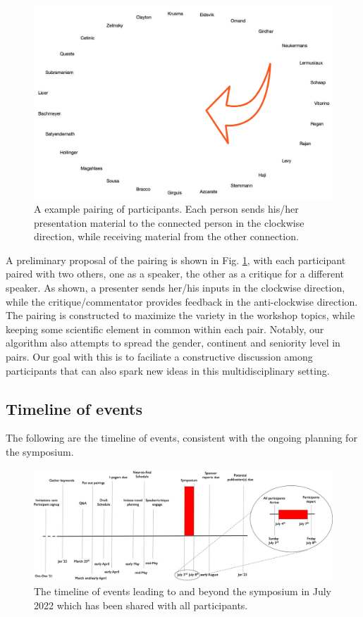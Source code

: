 \begin{figure}[!h]
  \centering 
  \includegraphics[scale=0.15]{fig/pairing.jpg}
  \caption{A example pairing of participants. Each person sends
    his/her presentation material to the connected person in the
    clockwise direction, while receiving material from the other
    connection.}
  \label{fig:pairs}
\end{figure}

A preliminary proposal of the pairing is shown in
Fig. \ref{fig:pairs}, with each participant paired with two others,
one as a speaker, the other as a critique for a different speaker. As
shown, a presenter sends her/his inputs in the clockwise direction,
while the critique/commentator provides feedback in the anti-clockwise
direction.  The pairing is constructed to maximize the variety in the
workshop topics, while keeping some scientific element in common
within each pair. Notably, our algorithm also attempts to spread the
gender, continent and seniority level in pairs. Our goal with this is
to faciliate a constructive discussion among participants that can
also spark new ideas in this multidisciplinary setting.

\subsection{Timeline of events}

The following are the timeline of events, consistent with the ongoing
planning for the symposium.

\begin{figure}[!h]
  \centering 
  \includegraphics[scale=0.3]{fig/timeline.jpg}
  \caption{The timeline of events leading to and beyond the symposium
    in July 2022 which has been shared with all participants.}
  \label{fig:timeline}
\end{figure}
